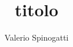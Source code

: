 \documentclass{article}
\title{titolo}
\author{Valerio Spinogatti}
\begin{document}
\maketitle
\newpage

\section{}
\end{document}
